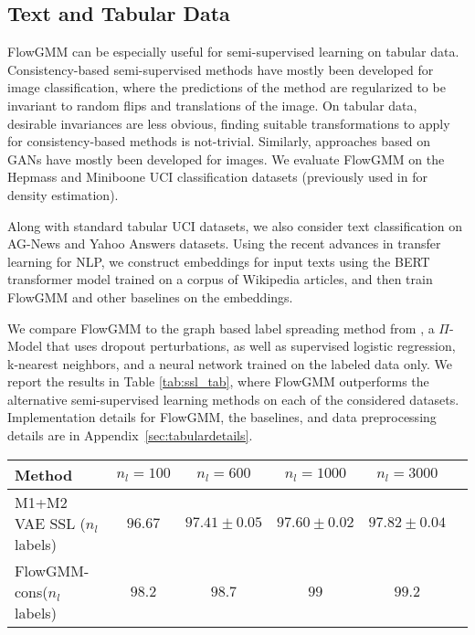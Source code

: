 \documentclass{article}
\newcommand{\method}{FlowGMM\xspace}
\newcommand{\methodcons}{FlowGMM-cons\xspace}
\begin{document}
\subsection{Text and Tabular Data}
\label{sec:exp_tab}

\method can be especially useful for semi-supervised learning on tabular data.
Consistency-based semi-supervised methods have mostly been developed for image classification, where the predictions of the method are regularized to be invariant to random flips and translations of the image. 
On tabular data, desirable invariances are less obvious, finding suitable transformations to apply for consistency-based methods is not-trivial.
Similarly, approaches based on GANs have mostly been developed for images. We evaluate FlowGMM on the Hepmass and Miniboone UCI classification datasets (previously used in \citet{papamakarios2017masked} for density estimation).

Along with standard tabular UCI datasets, we also consider text classification on \textrm{AG-News} and \textrm{Yahoo Answers} datasets. 
Using the recent advances in transfer learning for NLP, we construct embeddings for input texts using the BERT transformer model \citep{devlin2018bert} trained on a corpus of Wikipedia articles,
and then train \method and other baselines on the embeddings.

We compare \method to the graph based label spreading method from \citet{zhou2004learning}, a $\Pi$-Model \citep{laine2016temporal} that uses dropout perturbations, as well as supervised logistic regression, k-nearest neighbors, and a neural network trained on the labeled data only. 
We report the results in Table \ref{tab:ssl_tab}, where \method outperforms the alternative semi-supervised learning methods on each of the considered datasets. 
Implementation details for \method, the baselines, and data preprocessing details are in Appendix~\ref{sec:tabulardetails}. 

\begin{table*}[t]
	\centering
	\caption{
	Semi-supervised classification accuracy for \methodcons and VAE M1 + M2 model 
	\citep{kingma2014semi} on MNIST for different
	number of labeled data points $n_l$. 
    }
	\label{tab:labeled}
	\small
	\begin{tabular}{lccccc}
		Method                    & $n_l = 100$
		                          & $n_l = 600$  
                                  & $n_l = 1000$  
                                  & $n_l = 3000$ \\
		\midrule
		M1+M2 VAE SSL ($n_l$ labels)          & $96.67$ & $97.41 \pm 0.05$  & $97.60 \pm 0.02$        & $97.82 \pm 0.04$\\
        \methodcons ($n_l$ labels)            & $98.2$ & $98.7$ & $99$ & $99.2$ \\
	\end{tabular}
\end{table*}
\end{document}
